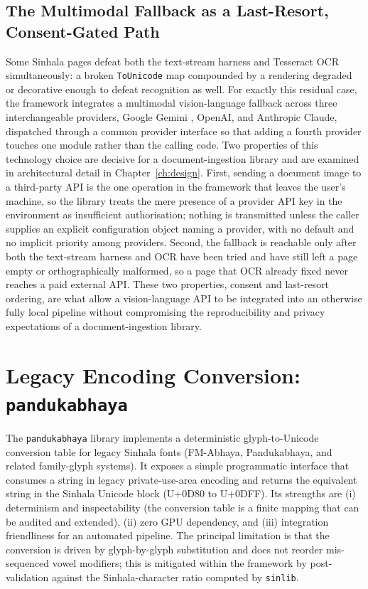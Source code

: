 \documentclass[12pt,a4paper,oneside]{report}
\begin{document}
\subsection{The Multimodal Fallback as a Last-Resort, Consent-Gated Path}
\label{sec:tech-multimodal}
Some Sinhala pages defeat both the text-stream harness and Tesseract OCR simultaneously: a broken \texttt{ToUnicode} map compounded by a rendering degraded or decorative enough to defeat recognition as well. For exactly this residual case, the framework integrates a multimodal vision-language fallback across three interchangeable providers, Google Gemini \cite{google2024gemini}, OpenAI, and Anthropic Claude, dispatched through a common provider interface so that adding a fourth provider touches one module rather than the calling code. Two properties of this technology choice are decisive for a document-ingestion library and are examined in architectural detail in Chapter~\ref{ch:design}. First, sending a document image to a third-party API is the one operation in the framework that leaves the user's machine, so the library treats the mere presence of a provider API key in the environment as insufficient authorisation; nothing is transmitted unless the caller supplies an explicit configuration object naming a provider, with no default and no implicit priority among providers. Second, the fallback is reachable only after both the text-stream harness and OCR have been tried and have still left a page empty or orthographically malformed, so a page that OCR already fixed never reaches a paid external API. These two properties, consent and last-resort ordering, are what allow a vision-language API to be integrated into an otherwise fully local pipeline without compromising the reproducibility and privacy expectations of a document-ingestion library.

\section{Legacy Encoding Conversion: \texttt{pandukabhaya}}
\label{sec:tech-pandukabhaya}
The \texttt{pandukabhaya} library implements a deterministic glyph-to-Unicode conversion table for legacy Sinhala fonts (FM-Abhaya, Pandukabhaya, and related family-glyph systems). It exposes a simple programmatic interface that consumes a string in legacy private-use-area encoding and returns the equivalent string in the Sinhala Unicode block (U+0D80 to U+0DFF). Its strengths are (i) determinism and inspectability (the conversion table is a finite mapping that can be audited and extended), (ii) zero GPU dependency, and (iii) integration friendliness for an automated pipeline. The principal limitation is that the conversion is driven by glyph-by-glyph substitution and does not reorder mis-sequenced vowel modifiers; this is mitigated within the framework by post-validation against the Sinhala-character ratio computed by \texttt{sinlib}.
\end{document}
